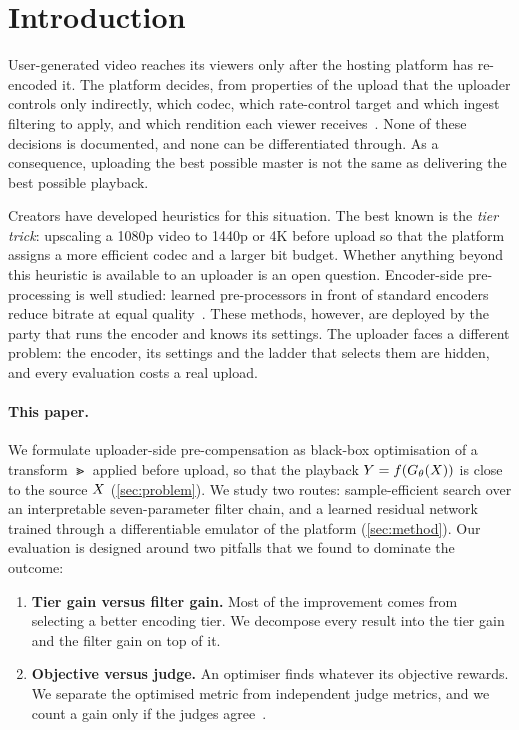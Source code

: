 \section{Introduction}
\label{sec:intro}

User-generated video reaches its viewers only after the hosting platform has re-encoded it. The
platform decides, from properties of the upload that the uploader controls only indirectly, which
codec, which rate-control target and which ingest filtering to apply, and which rendition each
viewer receives~\cite{meta2021facebook}. None of these decisions is documented, and none can be
differentiated through. As a consequence, uploading the best possible master is not the same as
delivering the best possible playback.

Creators have developed heuristics for this situation. The best known is the \emph{tier trick}:
upscaling a 1080p video to 1440p or 4K before upload so that the platform assigns a more efficient
codec and a larger bit budget. Whether anything beyond this heuristic is available to an uploader
is an open question. Encoder-side pre-processing is well studied: learned pre-processors in front of
standard encoders reduce bitrate at equal quality~\cite{bourtsoulatze2020deep,chadha2021deep,
ma2023rate,zhao2025tridynamic}. These methods, however, are deployed by the party that runs the
encoder and knows its settings. The uploader faces a different problem: the encoder, its settings
and the ladder that selects them are hidden, and every evaluation costs a real upload.

\paragraph{This paper.}
We formulate uploader-side pre-compensation as black-box optimisation of a transform
$\Gt$ applied before upload, so that the playback $Y = f(G_{\theta}(X))$ is close to the source
$X$ (\cref{sec:problem}). We study two routes: sample-efficient search over an interpretable
seven-parameter filter chain, and a learned residual network trained through a differentiable
emulator of the platform (\cref{sec:method}). Our evaluation is designed around two pitfalls that we
found to dominate the outcome:
\begin{enumerate}
  \item \textbf{Tier gain versus filter gain.} Most of the improvement comes from selecting a
        better encoding tier. We decompose every result into the tier gain and the filter gain on
        top of it.
  \item \textbf{Objective versus judge.} An optimiser finds whatever its objective rewards. We
        separate the optimised metric from independent judge metrics, and we count a gain only if
        the judges agree~\cite{zvezdakova2019hacking,siniukov2021hacking}.
\end{enumerate}

